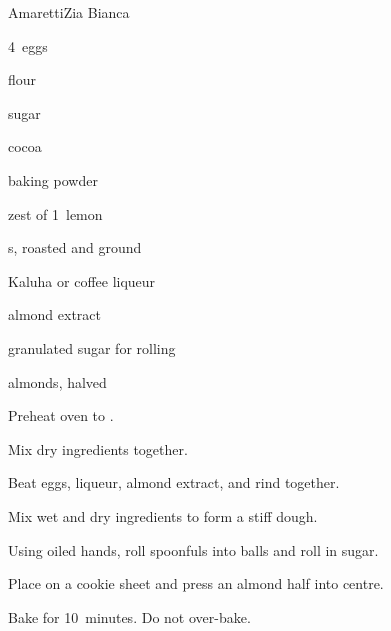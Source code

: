 \begin{recipe}{Amaretti}{Zia Bianca}{}

\begin{ingredients}
\item 4~eggs
\item {} flour
\item {} sugar
\item {} cocoa
\item {} baking powder
\item zest of 1~lemon
\item {} s, roasted and ground
\item {} Kaluha or coffee liqueur
\item {} almond extract
\item granulated sugar for rolling
\item almonds, halved
\end{ingredients}

\begin{directions}
\item Preheat oven to .
\item Mix dry ingredients together.
\item Beat eggs, liqueur, almond extract, and rind together.
\item Mix wet and dry ingredients to form a stiff dough.
\item Using oiled hands, roll spoonfuls into balls and roll in sugar.
\item Place on a cookie sheet and press an almond half into centre.
\item Bake for 10~minutes. Do not over-bake.
\end{directions}

\end{recipe}

